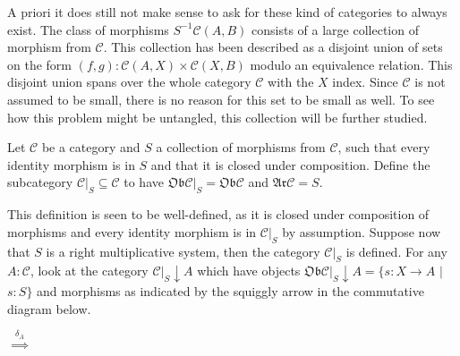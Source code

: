     A priori it does still not make sense to ask for these kind of categories to always exist. The class of morphisms $S^{-1}\mathcal{C}(A,B)$ consists of a large collection of morphism from $\mathcal{C}$. This collection has been described as a disjoint union of sets on the form $(f,g):\mathcal{C}(A,X)\times \mathcal{C}(X,B)$ modulo an equivalence relation. This disjoint union spans over the whole category $\mathcal{C}$ with the $X$ index. Since $\mathcal{C}$ is not assumed to be small, there is no reason for this set to be small as well. To see how this problem might be untangled, this collection will be further studied.

    \begin{definition}
        Let $\mathcal{C}$ be a category and $S$ a collection of morphisms from $\mathcal{C}$, such that every identity morphism is in $S$ and that it is closed under composition. Define the subcategory $\mathcal{C}|_{S} \subseteq \mathcal{C}$ to have $\mathfrak{Ob}\mathcal{C}|_{S} = \mathfrak{Ob}\mathcal{C}$ and $\mathfrak{Ar}\mathcal{C} = S$.
    \end{definition}

    This definition is seen to be well-defined, as it is closed under composition of morphisms and every identity morphism is in $\mathcal{C}|_{S}$ by assumption. Suppose now that $S$ is a right multiplicative system, then the category $\mathcal{C}|_{S}$ is defined. For any $A:\mathcal{C}$, look at the category $\mathcal{C}|_{S}\downarrow A$ which have objects $\mathfrak{Ob}\mathcal{C}|_{S}\downarrow A = \{s : X \rightarrow A$ $|$ $s : S\}$ and morphisms as indicated by the squiggly arrow in the commutative diagram below.
    
    \begin{center}
        $\stackrel{\delta_{A}}{\implies}$
    \end{center}

